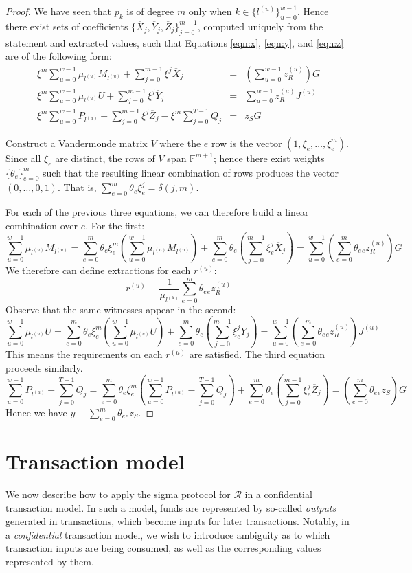 \documentclass{article}
\newcommand{\F}{\mathbb{F}}
\newcommand{\sumj}{\sum_{j=0}^{m-1}}
\newcommand{\sumu}{\sum_{u=0}^{w-1}}
\theoremstyle{definition}
\begin{document}
\begin{proof}
We have seen that $p_k$ is of degree $m$ only when $k \in \{l^{(u)}\}_{u=0}^{w-1}$.
Hence there exist sets of coefficients $\{\overline{X}_j,\overline{Y}_j,\overline{Z}_j\}_{j=0}^{m-1}$, computed uniquely from the statement and extracted values, such that Equations \ref{eqn:x}, \ref{eqn:y}, and \ref{eqn:z} are of the following form:
\begin{eqnarray*}
\xi^m \sumu \mu_{l^{(u)}}M_{l^{(u)}} + \sumj \xi^j\overline{X}_j &=& \left( \sumu z^{(u)}_R \right)G \\
\xi^m \sumu \mu_{l^{(u)}}U + \sumj \xi^j\overline{Y}_j &=& \sumu z^{(u)}_RJ^{(u)} \\
\xi^m \sumu P_{l^{(u)}} + \sumj \xi^j\overline{Z}_j - \xi^m \sum_{j=0}^{T-1} Q_j &=& z_SG
\end{eqnarray*}

Construct a Vandermonde matrix $V$ where the $e$ row is the vector $(1,\xi_e,\ldots,\xi^m_e)$.
Since all $\xi_e$ are distinct, the rows of $V$ span $\F^{m+1}$; hence there exist weights $\{\theta_e\}_{e=0}^m$ such that the resulting linear combination of rows produces the vector $(0,\ldots,0,1)$.
That is, $\sum_{e=0}^m \theta_e\xi_e^j = \delta(j,m)$.

For each of the previous three equations, we can therefore build a linear combination over $e$. For the first:
$$\sumu \mu_{l^{(u)}} M_{l^{(u)}} = \sum_{e=0}^m \theta_e\xi_e^m \left( \sumu \mu_{l^{(u)}} M_{l^{(u)}} \right) + \sum_{e=0}^m \theta_e \left( \sumj \xi_e^j \overline{X}_j \right) = \sumu \left( \sum_{e=0}^m \theta_e {}_ez^{(u)}_R \right) G$$
We therefore can define extractions for each $r^{(u)}$:
$$r^{(u)} \equiv \frac{1}{\mu_{l^{(u)}}} \sum_{e=0}^m \theta_e {}_ez^{(u)}_R$$
Observe that the same witnesses appear in the second:
$$\sumu \mu_{l^{(u)}} U = \sum_{e=0}^m \theta_e\xi_e^m \left( \sumu \mu_{l^{(u)}} U \right) + \sum_{e=0}^m \theta_e \left( \sumj \xi_e^j \overline{Y}_j \right) = \sumu \left( \sum_{e=0}^m \theta_e {}_ez^{(u)}_R \right) J^{(u)}$$
This means the requirements on each $r^{(u)}$ are satisfied. The third equation proceeds similarly.
$$\sumu P_{l^{(u)}} - \sum_{j=0}^{T-1} Q_j = \sum_{e=0}^m \theta_e\xi_e^m \left( \sumu P_{l^{(u)}} - \sum_{j=0}^{T-1} Q_j \right) + \sum_{e=0}^m \theta_e \left( \sumj \xi_e^j \overline{Z}_j \right) = \left( \sum_{e=0}^m \theta_e {}_ez_S  \right)G$$
Hence we have $y \equiv \sum_{e=0}^m \theta_e {}_ez_S$.
\end{proof}


\section{Transaction model}
We now describe how to apply the sigma protocol for $\mathcal{R}$ in a confidential transaction model.
In such a model, funds are represented by so-called \textit{outputs} generated in transactions, which become inputs for later transactions.
Notably, in a \textit{confidential} transaction model, we wish to introduce ambiguity as to which transaction inputs are being consumed, as well as the corresponding values represented by them.
\end{document}
